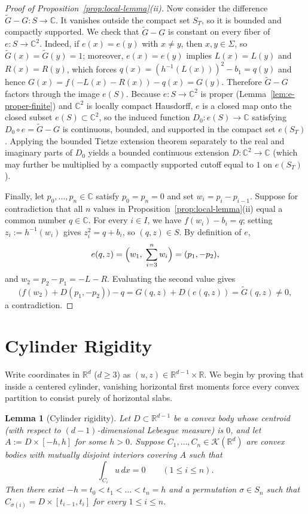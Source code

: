 \documentclass[11pt,a4paper]{amsart}
\numberwithin{equation}{section}
\newtheorem{lemma}[theorem]{Lemma}
\theoremstyle{definition}
\newcommand{\R}{\mathbb{R}}
\newcommand{\C}{\mathbb{C}}
\newcommand{\Kcal}{\mathcal{K}}
\begin{document}
\begin{proof}[Proof of Proposition~\ref{prop:local-lemma}(ii)]
Now consider the difference $\widetilde G - G : S \to \C$. It vanishes outside the compact set $S_T$, so it is bounded and compactly supported. We check that $\widetilde G - G$ is constant on every fiber of $e : S \to \C^2$. Indeed, if $e(x) = e(y)$ with $x \ne y$, then $x, y \in \Sigma$, so $\widetilde G(x) = \widetilde G(y) = 1$; moreover, $e(x) = e(y)$ implies $L(x) = L(y)$ and $R(x) = R(y)$, which forces $q(x) = (h^{-1}(L(x)))^2 - b_1 = q(y)$ and hence $G(x) = f(-L(x)-R(x)) - q(x) = G(y)$. Therefore $\widetilde G - G$ factors through the image $e(S)$. Because $e : S \to \C^2$ is proper (Lemma~\ref{lem:e-proper-finite}) and $\C^2$ is locally compact Hausdorff, $e$ is a closed map onto the closed subset $e(S) \subset \C^2$, so the induced function $D_0 : e(S) \to \C$ satisfying $D_0 \circ e = \widetilde G - G$ is continuous, bounded, and supported in the compact set $e(S_T)$. Applying the bounded Tietze extension theorem separately to the real and imaginary parts of $D_0$ yields a bounded continuous extension $D : \C^2 \to \C$ (which may further be multiplied by a compactly supported cutoff equal to $1$ on $e(S_T)$).

Finally, let $p_0, \dots, p_n \in \C$ satisfy $p_0 = p_n = 0$ and set $w_i = p_i - p_{i-1}$. Suppose for contradiction that all $n$ values in Proposition~\ref{prop:local-lemma}(ii) equal a common number $q \in \C$. For every $i \in I$, we have $f(w_i) - b_i = q$; setting $z_i := h^{-1}(w_i)$ gives $z_i^2 = q + b_i$, so $(q, z) \in S$. By definition of $e$,
\[
e(q, z) = \Bigl(w_1,\; \sum_{i=3}^n w_i\Bigr) = (p_1, -p_2),
\]
and $w_2 = p_2 - p_1 = -L - R$. Evaluating the second value gives
\[
\bigl(f(w_2) + D(p_1, -p_2)\bigr) - q = G(q, z) + D(e(q, z)) = \widetilde G(q, z) \ne 0,
\]
a contradiction.
\end{proof}

\section{Cylinder Rigidity}
\label{sec:cylinder}

Write coordinates in $\R^d$ ($d \ge 3$) as $(u, z) \in \R^{d-1} \times \R$. We begin by proving that inside a centered cylinder, vanishing horizontal first moments force every convex partition to consist purely of horizontal slabs.

\begin{lemma}[Cylinder rigidity]
\label{lem:cylinder-rigidity}
Let $D \subset \R^{d-1}$ be a convex body whose centroid (with respect to $(d-1)$-dimensional Lebesgue measure) is $0$, and let $A := D \times [-h, h]$ for some $h > 0$. Suppose $C_1, \dots, C_n \in \Kcal(\R^d)$ are convex bodies with mutually disjoint interiors covering $A$ such that
\[
\int_{C_i} u \, dx = 0 \qquad (1 \le i \le n).
\]
Then there exist $-h = t_0 < t_1 < \dots < t_n = h$ and a permutation $\sigma \in S_n$ such that $C_{\sigma(i)} = D \times [t_{i-1}, t_i]$ for every $1 \le i \le n$.
\end{lemma}
\end{document}
